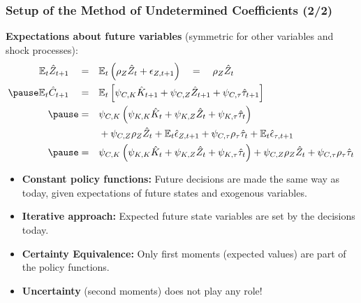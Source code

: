 \documentclass[10pt,c,aspectratio=1610,handout]{beamer}
\begin{document}
\begin{frame}%
  \frametitle{Setup of the Method of Undetermined Coefficients (2/2)}%
  \textbf{Expectations about future variables} {\small(symmetric for other variables and shock processes)}:%
  \begin{align}%
    \mathbb{E}_t \hat{Z}_{t+1} \quad = & \quad \mathbb{E}_t \left( \rho_Z \hat{Z}_t + \epsilon_{Z,t+1}\right) \quad = \quad \rho_Z \hat{Z}_t\\
    \pause%
    \mathbb{E}_t \hat{C}_{t+1} \quad = & \quad \mathbb{E}_t \left[ \psi_{C,K} \hat{K}_{t+1} + \psi_{C,Z} \hat{Z}_{t+1} + \psi_{C,\tau} \hat{\tau}_{t+1}\right]\notag\\%
    \pause%
    = & \quad \psi_{C,K} \left( \psi_{K,K} \hat{K}_{t} + \psi_{K,Z} \hat{Z}_{t} + \psi_{K,\tau} \hat{\tau}_{t} \right)\notag\\%
    & \quad + \psi_{C,Z} \rho_{Z} \hat{Z}_t + \mathbb{E}_t \hat{\epsilon}_{Z,t+1} + \psi_{C,\tau} \rho_\tau \hat{\tau}_t + \mathbb{E}_t \hat{\epsilon}_{\tau,t+1}\notag\\%
    \pause%
    = & \quad \psi_{C,K} \left( \psi_{K,K} \hat{K}_{t} + \psi_{K,Z} \hat{Z}_{t} + \psi_{K,\tau} \hat{\tau}_{t} \right) + \psi_{C,Z} \rho_{Z} \hat{Z}_t + \psi_{C,\tau} \rho_\tau \hat{\tau}_t%
  \end{align}%
  \pause%
  \begin{small}%
    \begin{itemize}%
      \item[$\blacktriangleright$] \textbf{Constant policy functions:} Future decisions are made the same way as today, given expectations of future states and exogenous variables.%
      \item[$\blacktriangleright$] \textbf{Iterative approach:} Expected future state variables are set by the decisions today.%
      \item[$\blacktriangleright$] \textbf{Certainty Equivalence:} Only first moments (expected values) are part of the policy functions.%
      \item[$\blacktriangleright$] \textbf{Uncertainty} (second moments) does not play any role!%
    \end{itemize}%
  \end{small}%
\end{frame}%
\end{document}
